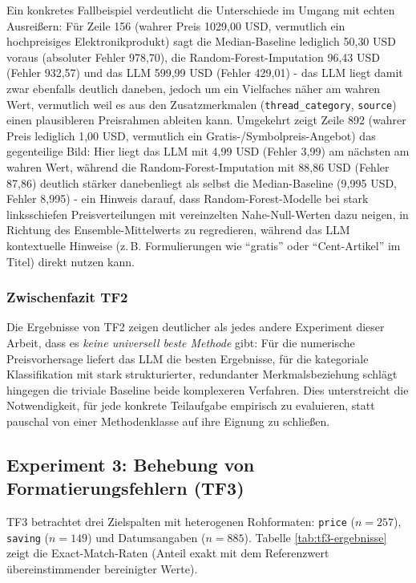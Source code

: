 Ein konkretes Fallbeispiel verdeutlicht die Unterschiede im Umgang mit echten
Ausreißern: Für Zeile 156 (wahrer Preis 1029{,}00 USD, vermutlich ein
hochpreisiges Elektronikprodukt) sagt die Median-Baseline lediglich 50{,}30
USD voraus (absoluter Fehler 978{,}70), die Random-Forest-Imputation 96{,}43
USD (Fehler 932{,}57) und das LLM 599{,}99 USD (Fehler 429{,}01) - das LLM
liegt damit zwar ebenfalls deutlich daneben, jedoch um ein Vielfaches näher am
wahren Wert, vermutlich weil es aus den Zusatzmerkmalen (\texttt{thread\_category},
\texttt{source}) einen plausibleren Preisrahmen ableiten kann. Umgekehrt zeigt
Zeile 892 (wahrer Preis lediglich 1{,}00 USD, vermutlich ein
Gratis-/Symbolpreis-Angebot) das gegenteilige Bild: Hier liegt das LLM mit
4{,}99 USD (Fehler 3{,}99) am nächsten am wahren Wert, während die
Random-Forest-Imputation mit 88{,}86 USD (Fehler 87{,}86) deutlich stärker
danebenliegt als selbst die Median-Baseline (9{,}995 USD, Fehler 8{,}995) -
ein Hinweis darauf, dass Random-Forest-Modelle bei stark linksschiefen
Preisverteilungen mit vereinzelten Nahe-Null-Werten dazu neigen, in Richtung
des Ensemble-Mittelwerts zu regredieren, während das LLM kontextuelle
Hinweise (z.\,B. Formulierungen wie \enquote{gratis} oder \enquote{Cent-Artikel}
im Titel) direkt nutzen kann.

\subsubsection*{Zwischenfazit TF2}

Die Ergebnisse von TF2 zeigen deutlicher als jedes andere Experiment dieser
Arbeit, dass es \emph{keine universell beste Methode} gibt: Für die
numerische Preisvorhersage liefert das LLM die besten Ergebnisse, für die
kategoriale Klassifikation mit stark strukturierter, redundanter
Merkmalsbeziehung schlägt hingegen die triviale Baseline beide komplexeren
Verfahren. Dies unterstreicht die Notwendigkeit, für jede konkrete
Teilaufgabe empirisch zu evaluieren, statt pauschal von einer
Methodenklasse auf ihre Eignung zu schließen.

\subsection{Experiment 3: Behebung von Formatierungsfehlern (TF3)}
\label{sec:experiment-tf3}

TF3 betrachtet drei Zielspalten mit heterogenen Rohformaten: \texttt{price}
($n = 257$), \texttt{saving} ($n = 149$) und Datumsangaben ($n = 885$).
Tabelle \ref{tab:tf3-ergebnisse} zeigt die Exact-Match-Raten (Anteil exakt mit
dem Referenzwert übereinstimmender bereinigter Werte).

